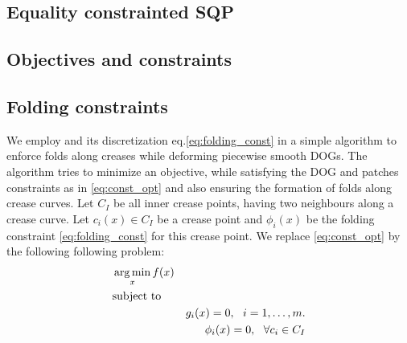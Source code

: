\subsection{Equality constrainted SQP}

\subsection{Objectives and constraints} \label{sec:dog_obj}

\subsection{Folding constraints}
We employ  and its discretization eq.\eqref{eq:folding_const} in a simple algorithm to enforce folds along creases while deforming piecewise smooth DOGs. The algorithm tries to minimize an objective, while satisfying the DOG and patches constraints as in \eqref{eq:const_opt} and also ensuring the formation of folds along crease curves. Let $C_{I}$ be all inner crease points, having two neighbours along a crease curve. Let $c_i(x) \in C_{I}$ be a crease point and $\phi_i(x) $ be the folding constraint \eqref{eq:folding_const} for this crease point. We replace \eqref{eq:const_opt} by the following following problem:
\begin{equation} \label{eq:const_opt}
\begin{aligned}
& \operatorname*{arg\,min}_x
f(x) \\
& \textrm{subject to} \\
& & g_i(x) = 0, \ \  i = 1, \ldots, m. \\
& & \phi_i(x) = 0, \ \  \forall c_i \in C_{I}
\end{aligned}
\end{equation}

